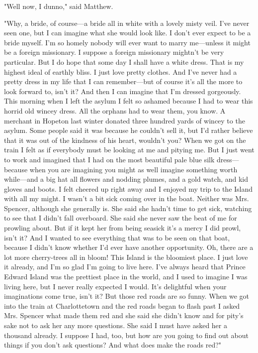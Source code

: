 \documentclass{article}
\begin{document}
"Well now, I dunno," said Matthew.

"Why, a bride, of course---a bride all in white with a lovely misty veil. I've never seen one, but I can imagine what she would look like. I don't ever expect to be a bride myself. I'm so homely nobody will ever want to marry me---unless it might be a foreign missionary. I suppose a foreign missionary mightn't be very particular. But I do hope that some day I shall have a white dress. That is my highest ideal of earthly bliss. I just love pretty clothes. And I've never had a pretty dress in my life that I can remember---but of course it's all the more to look forward to, isn't it? And then I can imagine that I'm dressed gorgeously. This morning when I left the asylum I felt so ashamed because I had to wear this horrid old wincey dress. All the orphans had to wear them, you know. A merchant in Hopeton last winter donated three hundred yards of wincey to the asylum. Some people said it was because he couldn't sell it, but I'd rather believe that it was out of the kindness of his heart, wouldn't you? When we got on the train I felt as if everybody must be looking at me and pitying me. But I just went to work and imagined that I had on the most beautiful pale blue silk dress---because when you are imagining you might as well imagine something worth while---and a big hat all flowers and nodding plumes, and a gold watch, and kid gloves and boots. I felt cheered up right away and I enjoyed my trip to the Island with all my might. I wasn't a bit sick coming over in the boat. Neither was Mrs. Spencer, although she generally is. She said she hadn't time to get sick, watching to see that I didn't fall overboard. She said she never saw the beat of me for prowling about. But if it kept her from being seasick it's a mercy I did prowl, isn't it? And I wanted to see everything that was to be seen on that boat, because I didn't know whether I'd ever have another opportunity. Oh, there are a lot more cherry-trees all in bloom! This Island is the bloomiest place. I just love it already, and I'm so glad I'm going to live here. I've always heard that Prince Edward Island was the prettiest place in the world, and I used to imagine I was living here, but I never really expected I would. It's delightful when your imaginations come true, isn't it? But those red roads are so funny. When we got into the train at Charlottetown and the red roads began to flash past I asked Mrs. Spencer what made them red and she said she didn't know and for pity's sake not to ask her any more questions. She said I must have asked her a thousand already. I suppose I had, too, but how are you going to find out about things if you don't ask questions? And what does make the roads red?"
\end{document}
